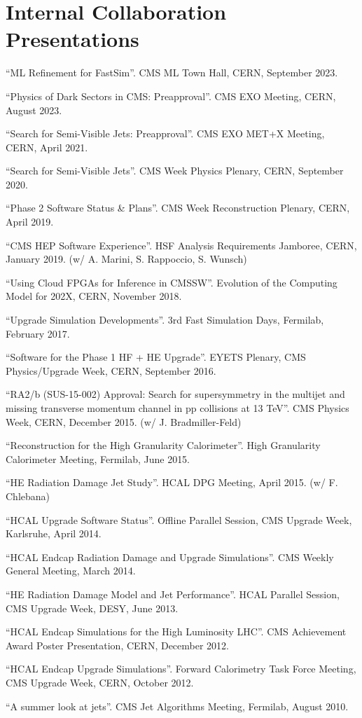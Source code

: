 \section{Internal Collaboration Presentations}
\begin{description}[leftmargin=12pt,font=\normalfont,labelsep=0em]
\item ``ML Refinement for FastSim''. CMS ML Town Hall, CERN, September 2023.
\item ``Physics of Dark Sectors in CMS: Preapproval''. CMS EXO Meeting, CERN, August 2023.
\item ``Search for Semi-Visible Jets: Preapproval''. CMS EXO MET+X Meeting, CERN, April 2021.
\item ``Search for Semi-Visible Jets''. CMS Week Physics Plenary, CERN, September 2020.
\item ``Phase 2 Software Status \& Plans''. CMS Week Reconstruction Plenary, CERN, April 2019.
\item ``CMS HEP Software Experience''. HSF Analysis Requirements Jamboree, CERN, January 2019. (w/ A. Marini, S. Rappoccio, S. Wunsch)
\item ``Using Cloud FPGAs for Inference in CMSSW''. Evolution of the Computing Model for 202X, CERN, November 2018.
\item ``Upgrade Simulation Developments''. 3rd Fast Simulation Days, Fermilab, February 2017.
\item ``Software for the Phase 1 HF + HE Upgrade''. EYETS Plenary, CMS Physics/Upgrade Week, CERN, September 2016.
\item ``RA2/b (SUS-15-002) Approval: Search for supersymmetry in the multijet and missing transverse momentum channel in pp collisions at 13 TeV''. CMS Physics Week, CERN, December 2015. (w/ J. Bradmiller-Feld)
\item ``Reconstruction for the High Granularity Calorimeter''. High Granularity Calorimeter Meeting, Fermilab, June 2015.
\item ``HE Radiation Damage Jet Study''. HCAL DPG Meeting, April 2015. (w/ F. Chlebana)
\item ``HCAL Upgrade Software Status''. Offline Parallel Session, CMS Upgrade Week, Karlsruhe, April 2014.
\item ``HCAL Endcap Radiation Damage and Upgrade Simulations''. CMS Weekly General Meeting, March 2014.
\item ``HE Radiation Damage Model and Jet Performance''. HCAL Parallel Session, CMS Upgrade Week, DESY, June 2013.
\item ``HCAL Endcap Simulations for the High Luminosity LHC''. CMS Achievement Award Poster Presentation, CERN, December 2012.
\item ``HCAL Endcap Upgrade Simulations''. Forward Calorimetry Task Force Meeting, CMS Upgrade Week, CERN, October 2012.
\item ``A summer look at jets''. CMS Jet Algorithms Meeting, Fermilab, August 2010.
\end{description}
\fi